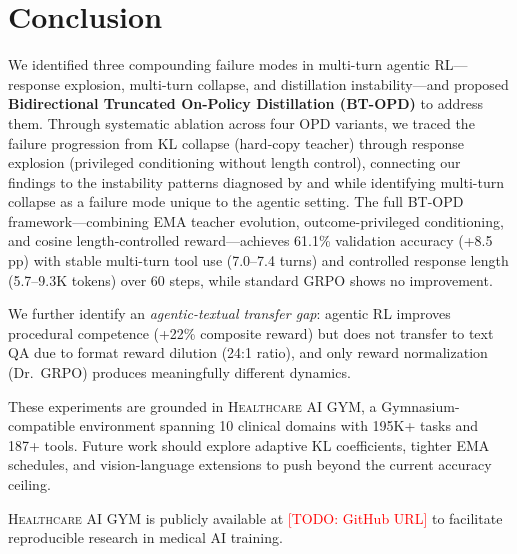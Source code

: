 \documentclass{article}
\newcommand{\gym}{\textsc{Healthcare AI GYM}}
\newcommand{\todo}[1]{\textcolor{red}{[TODO: #1]}}
\begin{document}
\section{Conclusion}
\label{sec:conclusion}

We identified three compounding failure modes in multi-turn agentic RL---response explosion, multi-turn collapse, and distillation instability---and proposed \textbf{Bidirectional Truncated On-Policy Distillation (BT-OPD)} to address them. Through systematic ablation across four OPD variants, we traced the failure progression from KL collapse (hard-copy teacher) through response explosion (privileged conditioning without length control), connecting our findings to the instability patterns diagnosed by \citet{yang26rlsd} and \citet{zhao26opsd} while identifying multi-turn collapse as a failure mode unique to the agentic setting. The full BT-OPD framework---combining EMA teacher evolution, outcome-privileged conditioning, and cosine length-controlled reward---achieves 61.1\% validation accuracy (+8.5 pp) with stable multi-turn tool use (7.0--7.4 turns) and controlled response length (5.7--9.3K tokens) over 60 steps, while standard GRPO shows no improvement.

We further identify an \emph{agentic-textual transfer gap}: agentic RL improves procedural competence (+22\% composite reward) but does not transfer to text QA due to format reward dilution (24:1 ratio), and only reward normalization (Dr.~GRPO) produces meaningfully different dynamics.

These experiments are grounded in \gym{}, a Gymnasium-compatible environment spanning 10 clinical domains with 195K+ tasks and 187+ tools. Future work should explore adaptive KL coefficients, tighter EMA schedules, and vision-language extensions to push beyond the current accuracy ceiling.

\gym{} is publicly available at \todo{GitHub URL} to facilitate reproducible research in medical AI training.



\end{document}
